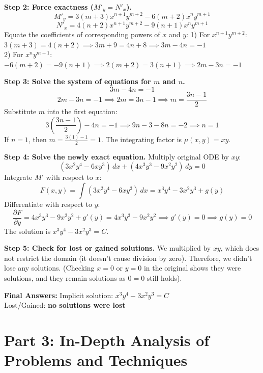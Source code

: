 \documentclass[11pt]{article}
\begin{document}
\textbf{Step 2: Force exactness ($M'_y = N'_x$).}
\[ M'_y = 3(m+3)x^{n+1}y^{m+2} - 6(m+2)x^n y^{m+1} \]
\[ N'_x = 4(n+2)x^{n+1}y^{m+2} - 9(n+1)x^n y^{m+1} \]
Equate the coefficients of corresponding powers of $x$ and $y$:
1) For $x^{n+1}y^{m+2}$: \quad $3(m+3) = 4(n+2) \implies 3m + 9 = 4n + 8 \implies 3m - 4n = -1$ \\
2) For $x^n y^{m+1}$: \quad $-6(m+2) = -9(n+1) \implies 2(m+2) = 3(n+1) \implies 2m - 3n = -1$

\textbf{Step 3: Solve the system of equations for $m$ and $n$.}
\[ 3m - 4n = -1 \]
\[ 2m - 3n = -1 \implies 2m = 3n - 1 \implies m = \frac{3n - 1}{2} \]
Substitute $m$ into the first equation:
\[ 3\left(\frac{3n - 1}{2}\right) - 4n = -1 \implies 9n - 3 - 8n = -2 \implies n = 1 \]
If $n = 1$, then $m = \frac{3(1) - 1}{2} = 1$. 
The integrating factor is $\mu(x,y) = xy$.

\textbf{Step 4: Solve the newly exact equation.}
Multiply original ODE by $xy$:
\[ (3x^2y^4 - 6xy^3) \, dx + (4x^3y^3 - 9x^2y^2) \, dy = 0 \]
Integrate $M'$ with respect to $x$:
\[ F(x,y) = \int (3x^2y^4 - 6xy^3) \, dx = x^3y^4 - 3x^2y^3 + g(y) \]
Differentiate with respect to $y$:
\[ \frac{\partial F}{\partial y} = 4x^3y^3 - 9x^2y^2 + g'(y) = 4x^3y^3 - 9x^2y^2 \implies g'(y) = 0 \implies g(y) = 0 \]
The solution is $x^3y^4 - 3x^2y^3 = C$.

\textbf{Step 5: Check for lost or gained solutions.}
We multiplied by $xy$, which does not restrict the domain (it doesn't cause division by zero). Therefore, we didn't lose any solutions. (Checking $x=0$ or $y=0$ in the original shows they were solutions, and they remain solutions as $0=0$ still holds).

\textbf{Final Answers:}
Implicit solution: $x^3y^4 - 3x^2y^3 = C$ \\
Lost/Gained: \textbf{no solutions were lost}

\newpage
\section{Part 3: In-Depth Analysis of Problems and Techniques}
\end{document}
